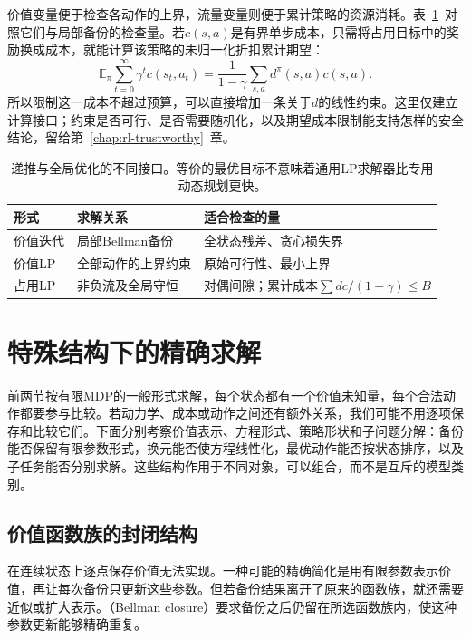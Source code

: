 价值变量便于检查各动作的上界，流量变量则便于累计策略的资源消耗。表~\ref{tab:rl-planning-dp-lp}~对照它们与局部备份的检查量。若$c(s,a)$是有界单步成本，只需将占用目标中的奖励换成成本，就能计算该策略的未归一化折扣累计期望：
\[
 \mathbb E_\pi\sum_{t=0}^{\infty}\gamma^t c(s_t,a_t)
 =\frac{1}{1-\gamma}\sum_{s,a}d^\pi(s,a)c(s,a).
\]
所以限制这一成本不超过预算，可以直接增加一条关于$d$的线性约束。这里仅建立计算接口；约束是否可行、是否需要随机化，以及期望成本限制能支持怎样的安全结论，留给第~\ref{chap:rl-trustworthy}~章。

\begin{table}[htbp]
 \centering
 \small
 \begin{tabularx}{\linewidth}{@{}l>{\raggedright\arraybackslash}X>{\raggedright\arraybackslash}X@{}}
  \toprule
  形式 & 求解关系 & 适合检查的量\\
  \midrule
  价值迭代 & 局部Bellman备份 & 全状态残差、贪心损失界\\
  价值LP & 全部动作的上界约束 & 原始可行性、最小上界\\
  占用LP & 非负流及全局守恒 & 对偶间隙；累计成本$\sum dc/(1-\gamma)\leq B$\\
  \bottomrule
 \end{tabularx}
 \caption{递推与全局优化的不同接口。等价的最优目标不意味着通用LP求解器比专用动态规划更快。}
 \label{tab:rl-planning-dp-lp}
\end{table}

\section{特殊结构下的精确求解}
\label{sec:rl-planning-structure}

前两节按有限MDP的一般形式求解，每个状态都有一个价值未知量，每个合法动作都要参与比较。若动力学、成本或动作之间还有额外关系，我们可能不用逐项保存和比较它们。下面分别考察价值表示、方程形式、策略形状和子问题分解：备份能否保留有限参数形式，换元能否使方程线性化，最优动作能否按状态排序，以及子任务能否分别求解。这些结构作用于不同对象，可以组合，而不是互斥的模型类别。

\subsection{价值函数族的封闭结构}
\label{sec:rl-planning-closure}

在连续状态上逐点保存价值无法实现。一种可能的精确简化是用有限参数表示价值，再让每次备份只更新这些参数。但若备份结果离开了原来的函数族，就还需要近似或扩大表示。（Bellman closure）要求备份之后仍留在所选函数族内，使这种参数更新能够精确重复。

